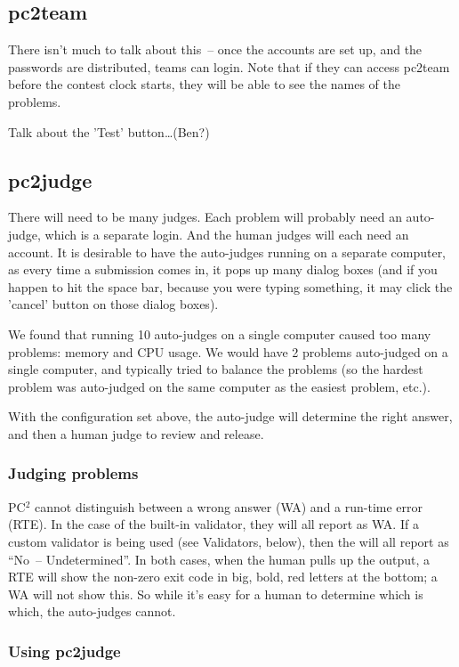 \subsection{pc2team}

There isn't much to talk about this~-- once the accounts are set up,
and the passwords are distributed, teams can login.  Note that if they
can access pc2team before the contest clock starts, they will be able
to see the names of the problems.

Talk about the 'Test' button\ldots (Ben?)


\subsection{pc2judge}

There will need to be many judges.  Each problem will probably need an
auto-judge, which is a separate login.  And the human judges will each
need an account.  It is desirable to have the auto-judges running on a
separate computer, as every time a submission comes in, it pops up
many dialog boxes (and if you happen to hit the space bar, because you
were typing something, it may click the 'cancel' button on those
dialog boxes).

We found that running 10 auto-judges on a single computer caused too
many problems: memory and CPU usage.  We would have 2 problems
auto-judged on a single computer, and typically tried to balance the
problems (so the hardest problem was auto-judged on the same computer
as the easiest problem, etc.).

With the configuration set above, the auto-judge will determine the
right answer, and then a human judge to review and release.

\subsubsection{Judging problems}

PC$^2$ cannot distinguish between a wrong answer (WA) and a run-time
error (RTE).  In the case of the built-in validator, they will all
report as WA.  If a custom validator is being used (see Validators,
below), then the will all report as ``No~-- Undetermined''.  In both
cases, when the human pulls up the output, a RTE will show the
non-zero exit code in big, bold, red letters at the bottom; a WA will
not show this.  So while it's easy for a human to determine which is
which, the auto-judges cannot.

\subsubsection{Using pc2judge}

